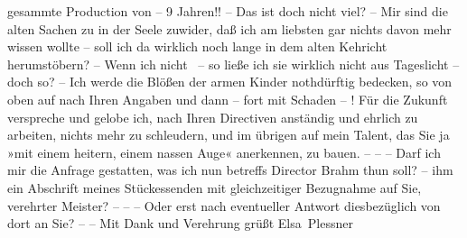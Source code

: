                gesammte Production von – 9 Jahren!! – Das ist doch nicht viel? – Mir sind die alten
               Sachen zu in der Seele zuwider, daß ich am liebsten gar nichts davon mehr wissen
               wollte – soll ich da wirklich noch lange in dem alten Kehricht herumstöbern? – Wenn
               ich nicht  – so ließe ich sie wirklich nicht
               aus Tageslicht – doch so? – Ich werde die Blößen der armen Kinder nothdürftig
               bedecken, so von oben auf nach Ihren Angaben und dann – fort mit Schaden – ! Für die
               Zukunft verspreche und gelobe ich, nach Ihren Directiven anständig und ehrlich zu
               arbeiten, nichts mehr zu schleudern, und im übrigen auf mein Talent, das Sie ja »mit
               einem heitern, einem nassen Auge« anerkennen, zu bauen. – – – Darf ich mir die
               Anfrage gestatten, was ich nun betreffs Director Brahm thun soll? – ihm ein Abschrift meines Stückes\introOben{}senden\introOben{} mit gleichzeitiger Bezugnahme auf Sie, verehrter
               Meister? – – – Oder erst nach eventueller Antwort diesbezüglich von dort an Sie? – – \pend
           \pstart Mit Dank und Verehrung grüßt \spacefill\mbox{Elsa Plessner}\pend{}\endnumbering{}
\begin{anhang}
\end{anhang}
      